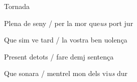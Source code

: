 \documentclass[12pt]{article}
\begin{document}
\begin{estrofaExtra}%




\begin{tornada}

Tornada

\end{tornada}


\end{estrofaExtra}


\begin{estrofa}

 Plena de seny / per la mor que\textit{us} port jur

 Que sim ve tard / la vostra ben uolen\c{c}a

 Present detots / fare demj senten\c{c}a

 Que sonara / mentrel mon dels vi\textit{us} dur

\end{estrofa}
\end{document}
